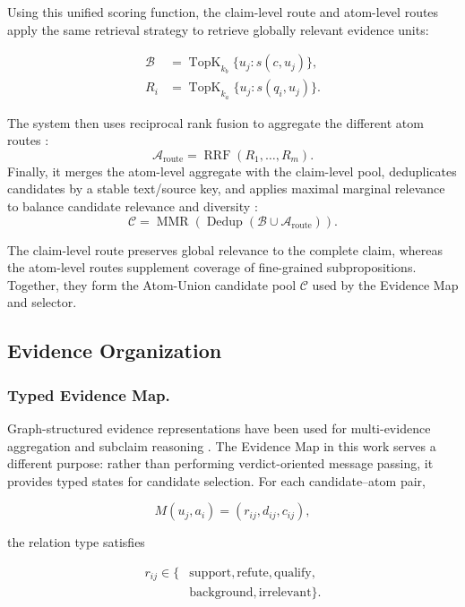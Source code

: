 \documentclass[letterpaper]{article}
\begin{document}
Using this unified scoring function, the claim-level route and atom-level routes apply the same retrieval strategy to retrieve globally relevant evidence units:

\[
\begin{aligned}
\mathcal B &= \operatorname{TopK}_{k_b}\{u_j:s(c,u_j)\},\\
R_i &= \operatorname{TopK}_{k_a}\{u_j:s(q_i,u_j)\}.
\end{aligned}
\]

The system then uses reciprocal rank fusion to aggregate the different atom routes \citep{Cormack2009RRF}:
\[
\mathcal A_{\mathrm{route}}
=
\operatorname{RRF}(R_1,\ldots,R_m).
\]
Finally, it merges the atom-level aggregate with the claim-level pool, deduplicates candidates by a stable text/source key, and applies maximal marginal relevance to balance candidate relevance and diversity \citep{Goldstein1998MMR}:
\[
\mathcal C
=
\operatorname{MMR}\!\left(
\operatorname{Dedup}
\left(
\mathcal B\cup\mathcal A_{\mathrm{route}}
\right)
\right).
\]

The claim-level route preserves global relevance to the complete claim, whereas the atom-level routes supplement coverage of fine-grained subpropositions. Together, they form the Atom-Union candidate pool $\mathcal C$ used by the Evidence Map and selector.

\subsection{Evidence Organization}

\subsubsection{Typed Evidence Map.}

Graph-structured evidence representations have been used for multi-evidence aggregation and subclaim reasoning \citep{Zhou2019GEAR,Liu2019KGAT,Wang2026GDefense,Lourenco2026KGCRAFT}. The Evidence Map in this work serves a different purpose: rather than performing verdict-oriented message passing, it provides typed states for candidate selection. For each candidate--atom pair,

\[
M(u_j,a_i)=(r_{ij},d_{ij},c_{ij}),
\]

the relation type satisfies

\[
\begin{aligned}
r_{ij}\in\{&\text{support},\text{refute},\text{qualify},\\
             &\text{background},\text{irrelevant}\}.
\end{aligned}
\]
\end{document}
